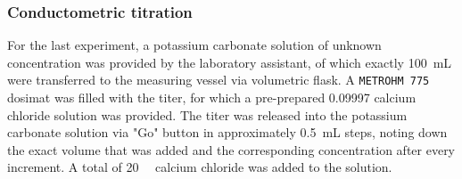 \subsubsection{Conductometric titration}

For the last experiment, a potassium carbonate solution of unknown concentration was provided by the laboratory assistant, of which exactly \qty{100}{\milli\liter} were transferred to the measuring vessel via volumetric flask. A \texttt{METROHM 775} dosimat was filled with the titer, for which a pre-prepared \qty[round-precision=5]{0.09997}{\M} calcium chloride solution was provided. The titer was released into the potassium carbonate solution via "Go" button in approximately \qty{0.5}{\milli\liter} steps, noting down the exact volume that was added and the corresponding concentration after every increment. A total of \qty{20}{\milli\liters} calcium chloride was added to the solution. 






